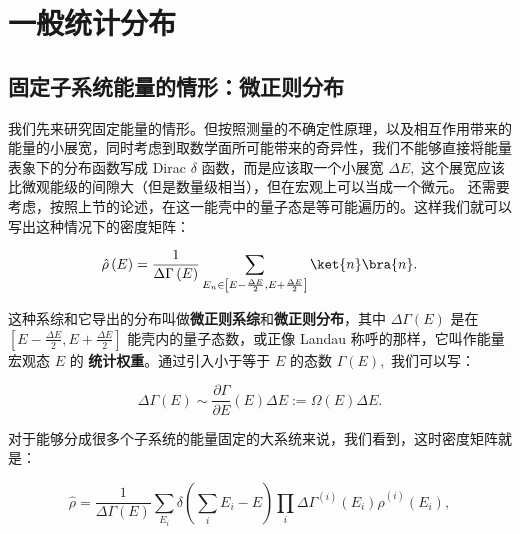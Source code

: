 \section{一般统计分布}
\subsection{固定子系统能量的情形：微正则分布}
我们先来研究固定能量的情形。但按照测量的不确定性原理，以及相互作用带来的能量的小展宽，同时考虑到取数学面所可能带来的奇异性，我们不能够直接将能量表象下的分布函数写成 Dirac $\delta$ 函数，而是应该取一个小展宽 $\Delta E,$ 这个展宽应该比微观能级的间隙大（但是数量级相当），但在宏观上可以当成一个微元。
还需要考虑，按照上节的论述，在这一能壳中的量子态是等可能遍历的。这样我们就可以写出这种情况下的密度矩阵：
\begin{linenomath}\begin{equation}
\hat{\rho}\left( E \right) = \frac{1}{\Delta \Gamma \left( E \right)} \sum_{E_n\in\left[ E-\frac{\Delta E}{2}, E+\frac{\Delta E}{2}\right]}\ket{n}\bra{n}.
\label{microcan}\end{equation}\end{linenomath}
这种系综和它导出的分布叫做\textbf{微正则系综}和\textbf{微正则分布}，其中 $\Delta \Gamma\left( E \right)$ 是在 $\left[ E-\frac{\Delta E}{2}, E+\frac{\Delta E}{2}\right]$ 能壳内的量子态数，或正像 Landau 称呼的那样，它叫作能量宏观态 $E$ 的 \textbf{统计权重}。通过引入小于等于 $E$ 的态数 $\Gamma \left( E \right),$ 我们可以写：
\begin{linenomath}\begin{equation}
\Delta \Gamma \left( E \right) \sim \frac{\partial\Gamma}{\partial E}\left( E \right)\Delta E := \Omega \left( E \right)\Delta E.
\end{equation}\end{linenomath}
对于能够分成很多个子系统的能量固定的大系统来说，我们看到，这时密度矩阵就是：
\begin{linenomath}
  \begin{equation}
    \hat\rho = \frac{1}{\Delta\Gamma\left( E \right)}\sum_{E_i} \delta(\sum_{i} E_i - E)\prod_i \Delta\Gamma^{\left( i \right)}(E_i) {\hat\rho}^{\left( i \right)}\left( E_i \right),
  \label{subsys}\end{equation}
\end{linenomath}

